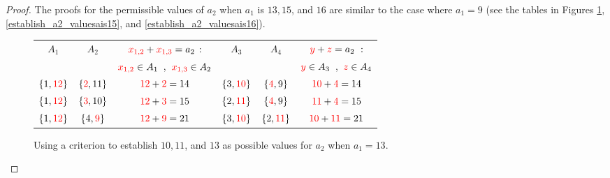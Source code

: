 \documentclass[10pt,a4paper]{amsart}
\begin{document}
\begin{proof}
The proofs for the permissible values of $a_2$ when $a_1$ is $13, 15$, and $16$ are similar to the case where $a_1=9$ (see the tables in Figures \ref{establish_a2_valuesais13}, \ref{establish_a2_valuesais15}, and  \ref{establish_a2_valuesais16}).

\begin{figure}[hbt!]
    \centering
\renewcommand{\arraystretch}{1.5}
\begin{tabular}{|c|c|c|c|c|c|} \hline
$A_1$ & $A_2$  & $\textcolor{red}{x_{1,2}}+\textcolor{red}{x_{1,3}}=a_2$ : & $A_3$ &  $A_4$ & $\textcolor{red}{y}+\textcolor{red}{z} = a_2\ :$\\ 
      &            &   $\textcolor{red}{x_{1,2}}\in A_1$\ ,\ $\textcolor{red}{x_{1,3}}\in A_2$                                      &      &    &
$\textcolor{red}{y}\in A_3$\ ,\ $\textcolor{red}{z}\in A_4$ \\  \hline
$\{1, \textcolor{red}{12}\}$ & $\{\textcolor{red}{2}, 11\}$ & $\textcolor{red}{12}+\textcolor{red}{2}=14$ & $\{ 3,\textcolor{red}{10}\}$ &  $\{ \textcolor{red}{4}, 9  \}$ &  $\textcolor{red}{10}+\textcolor{red}{4}=14$\\  \hline
$\{1,\textcolor{red}{12}\}$ & $\{\textcolor{red}{3}, 10\}$ & $\textcolor{red}{12}+\textcolor{red}{3}=15$ & $\{ 2,\textcolor{red}{11}\}$ &  $\{ \textcolor{red}{4}, 9  \}$ &  $\textcolor{red}{11}+\textcolor{red}{4}=15$\\  \hline
$\{1, \textcolor{red}{12}\}$ & $\{4, \textcolor{red}{9}\}$ & $\textcolor{red}{12}+\textcolor{red}{9}=21$ & $\{ 3,\textcolor{red}{10}\}$ &  $\{ 2, \textcolor{red}{11}  \}$ &  $\textcolor{red}{10}+\textcolor{red}{11}=21$\\  \hline
\end{tabular}
    
    \caption{Using a criterion to establish $10, 11$, and $13$ as possible values for $a_2$ when $a_1=13$.}
    \label{establish_a2_valuesais13}
\end{figure}


\end{proof}
\end{document}
